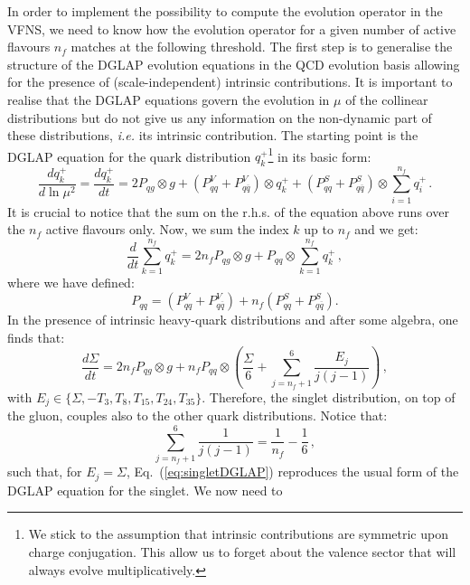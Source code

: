 \documentclass[10pt,a4paper]{article}
\begin{document}
In order to implement the possibility to compute the evolution
operator in the VFNS, we need to know how the evolution operator for a
given number of active flavours $n_f$ matches at the following
threshold. The first step is to generalise the structure of the DGLAP
evolution equations in the QCD evolution basis allowing for the
presence of (scale-independent) intrinsic contributions. It is
important to realise that the DGLAP equations govern the evolution in
$\mu$ of the collinear distributions but do not give us any
information on the non-dynamic part of these distributions,
\textit{i.e.} its intrinsic contribution. The starting point is the
DGLAP equation for the quark distribution $q_k^+$\footnote{We stick to
  the assumption that intrinsic contributions are symmetric upon
  charge conjugation. This allow us to forget about the valence sector
  that will always evolve multiplicatively.} in its basic form:
\begin{equation}
\frac{dq_k^+}{d\ln\mu^2} =\frac{dq_k^+}{dt}= 2P_{qg}\otimes g+
(P_{qq}^V+P_{q\overline{q}}^V)\otimes
q_k^++(P_{qq}^S+P_{q\overline{q}}^S)\otimes \sum_{i=1}^{n_f} q_i^+\,.
\end{equation}
It is crucial to notice that the sum on the r.h.s. of the equation
above runs over the $n_f$ active flavours only. Now, we sum the index
$k$ up to $n_f$ and we get:
\begin{equation}
\frac{d}{dt}\sum_{k=1}^{n_f} q_k^+= 2n_f P_{qg}\otimes g+
P_{qq}\otimes \sum_{k=1}^{n_f} q_k^+\,,
\end{equation}
where we have defined:
\begin{equation}
P_{qq} = (P_{qq}^V+P_{q\overline{q}}^V)+n_f(P_{qq}^S+P_{q\overline{q}}^S).
\end{equation}
In the presence of intrinsic heavy-quark distributions and after some
algebra, one finds that:
\begin{equation}
\frac{d\Sigma}{dt}= 2n_f P_{qg}\otimes g+n_fP_{qq}\otimes
\left(\frac{\Sigma}{6}+\sum_{j=n_f+1}^6\frac{E_j}{j(j-1)}\right)\,,
\label{eq:singletDGLAP}
\end{equation}
with $E_j\in \{\Sigma,-T_3,T_8,T_{15},T_{24},T_{35}\}$. Therefore, the
singlet distribution, on top of the gluon, couples also to the other
quark distributions. Notice that:
\begin{equation}
\sum_{j=n_f+1}^6\frac{1}{j(j-1)} = \frac{1}{n_f}-\frac16\,,
\end{equation}
such that, for $E_j = \Sigma$, Eq.~(\ref{eq:singletDGLAP}) reproduces
the usual form of the DGLAP equation for the singlet. We now need to
\end{document}
